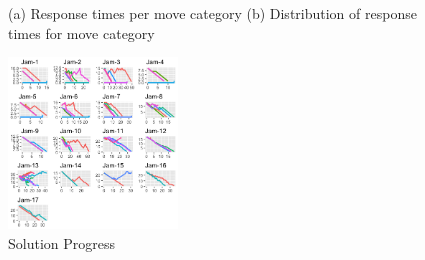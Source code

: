 \documentclass[10pt,letterpaper]{article}
\begin{document}
\begin{figure}[!htb]
	\centering
	\caption{(a) Response times per move category (b) Distribution of response times for move category}
	\label{fig:p8}
\end{figure}

\begin{figure}[!ht]
\begin{center}
\includegraphics[width=0.4\textwidth]{p6}
\end{center}
\caption{Solution Progress} 
\label{fig:p6}
\end{figure}
\end{document}
